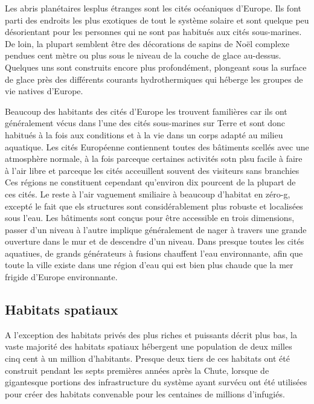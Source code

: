 Les abris planétaires lesplus étranges sont les cités océaniques d'Europe. Ils font parti des endroits les plus exotiques de tout le système solaire et sont quelque peu désorientant pour les personnes qui ne sont pas habitués aux cités sous-marines. De loin, la plupart semblent être des décorations de sapins de Noël complexe pendues cent mètre ou plus sous le niveau de la couche de glace au-dessus. Quelques uns sont construits encore plus profondément, plongeant sous la surface de glace près des différents courants hydrothermiques qui héberge les groupes de vie natives d'Europe. 

Beaucoup des habitants des cités d'Europe les trouvent familières car ils ont généralement vécus dans l'une des cités sous-marines sur Terre et sont donc habitués à la fois aux conditions et à la vie dans un corps adapté au milieu aquatique. Les cités Européenne contiennent toutes des bâtiments scellés avec une atmosphère normale, à la fois parceque certaines activités sotn plsu facile à faire à l'air libre et parceque les cités acceuillent souvent des visiteurs sans branchies Ces régions ne constituent cependant qu'environ dix pourcent de la plupart de ces cités. Le reste à l'air vaguement smiliaire à beaucoup d'habitat en zéro-g, excepté le fait que els structures sont considérablement plus robuste et localisées sous l'eau. Les bâtiments sont conçus pour être accessible en trois dimensions, passer d'un niveau à l'autre implique généralement de nager à travers une grande ouverture dans le mur et de descendre d'un niveau. Dans presque toutes les cités aquatiues, de grands générateurs à fusions chauffent l'eau environnante, afin que toute la ville existe dans une région d'eau qui est bien plus chaude que la mer frigide d'Europe environnante. 

\subsection{Habitats spatiaux} \label{sec:space-habitats} 

A l'exception des habitats privés des plus riches et puissants décrit plus bas, la vaste majorité des habitats spatiaux hébergent une population de deux milles cinq cent à un million d'habitants. Presque deux tiers de ces habitats ont été construit pendant les septs premières années après la Chute, lorsque de gigantesque portions des infrastructure du système ayant survécu ont été utilisées pour créer des habitats convenable pour les centaines de millions d'infugiés. 

